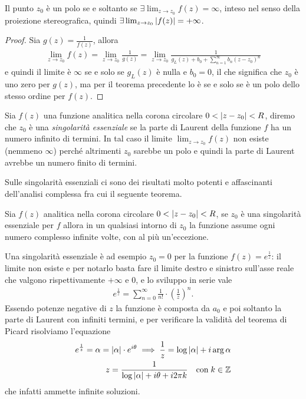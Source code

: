 \begin{theorem}[  ]
  Il punto $ z_0 $ è un polo se e soltanto se $ \exists \lim_{z \to z_0} f(z) = \infty $, inteso nel senso della proiezione stereografica, quindi 
  $ \exists \lim_{z \to z_0} \left|{f(z)}\right| = +\infty $.
\end{theorem}
\begin{proof}
  Sia $ g(z) = \frac1{f(z)} $, allora
  \begin{align}
    \lim_{z \to z_0} f(z) = \lim_{z \to z_0} \frac1{g(z)} = \lim_{z \to z_0} \frac1{g_L(z) + b_0 + \sum_{n = 1}^\infty b_n (z - z_0)^n }
  \end{align}
  e quindi il limite è $ \infty $ se e solo se $ g_L(z) $ è nulla e $ b_0 = 0 $, il che significa che $ z_0 $ è uno zero per $ g(z) $, ma per il teorema 
  precedente lo è se e solo se è un polo dello stesso ordine per $ f(z) $.
\end{proof}

\begin{definition}
  Sia $ f(z) $ una funzione analitica nella corona circolare $ 0 < \left|{z - z_0}\right| < R $, diremo che $ z_0 $ è una \textit{singolarità essenziale} se 
  la parte di Laurent della funzione $ f $ ha un numero infinito di termini. In tal caso il limite $ \lim_{z \to z_0} f(z) $ non esiste 
  (nemmeno $ \infty $) perché altrimenti $ z_0 $ sarebbe un polo e quindi la parte di Laurent avrebbe un numero finito di termini.
\end{definition}

Sulle singolarità essenziali ci sono dei risultati molto potenti e affascinanti dell'analisi complessa fra cui il seguente teorema.

\begin{theorem}[ di Picard ]
  Sia $ f(z) $ analitica nella corona circolare $ 0 < \left|{z - z_0}\right| < R $, se $ z_0 $ è una singolarità essenziale per $ f $ allora in un 
  qualsiasi intorno di $ z_0 $ la funzione assume ogni numero complesso infinite volte, con al più un'eccezione.
\end{theorem}

\begin{example}
  Una singolarità essenziale è ad esempio $ z_0 = 0 $ per la funzione $ f(z) = e^{\frac1z} $: il limite non esiste e per notarlo basta fare il limite destro 
  e sinistro sull'asse reale che valgono rispettivamente $ +\infty $ e $ 0 $, e lo sviluppo in serie vale
  \begin{align}
    e^{\frac1z} = \sum_{n = 0}^\infty \frac1{n!} \cdot \left( \frac1z \right)^n.
  \end{align}
  Essendo potenze negative di $ z $ la funzione è composta da $ a_0 $ e poi soltanto la parte di Laurent con infiniti termini, e per verificare la validità 
  del teorema di Picard risolviamo l'equazione 
  \begin{align}
    e^{\frac1z} = \alpha = \left|{\alpha}\right| \cdot e^{i\theta} \implies \frac1z = \log \left|{\alpha}\right| + i \arg \alpha
    \\
    z = \frac1{\log \left|{\alpha}\right| + i\theta + i2\pi k} \quad \textnormal{con}\; k \in \mathbb{Z}
  \end{align}
  che infatti ammette infinite soluzioni.
\end{example}

